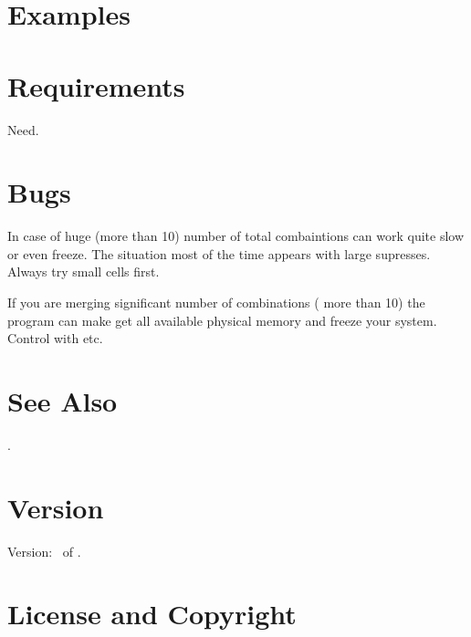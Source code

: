\documentclass[a4paper,english]{article}
\begin{document}
\section{Examples}


\section{Requirements}

\begin{description}\setlength{\itemsep}{0cm}
\item[openbabel] Need.
\end{description}

\section{Bugs}

\begin{description}\setlength{\itemsep}{0cm}
\item In case of huge (more than 10) number of total combaintions  can work quite slow or even freeze. The situation most of the time appears with large supresses. Always try small cells first.
\item If you are merging significant number of combinations ( more than 10) the program can make get all available physical memory and freeze your system. Control  with  etc.

\end{description}

\section{See Also}

.


\section{Version}

Version: \Version\ of \Date.

\section{License and Copyright}
\end{document}
